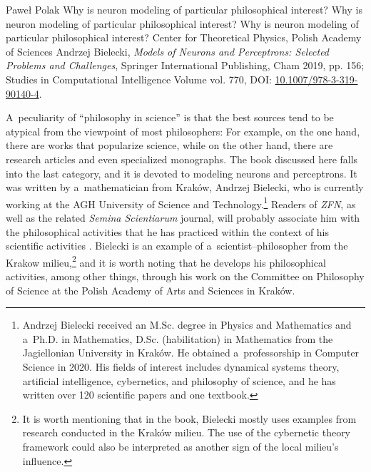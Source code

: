 \begin{newrevengenv}{Paweł Polak}
	{Why is neuron modeling of particular philosophical interest?}
	{Why is neuron modeling of particular philosophical interest?}
	{Why is neuron modeling of particular philosophical interest?}
	{Center for Theoretical Physics, Polish Academy of Sciences}
	{Andrzej Bielecki, \textit{Models of Neurons and Perceptrons: Selected Problems and Challenges}, Springer International Publishing, Cham 2019, pp. 156; Studies in Computational Intelligence Volume vol. 770, DOI: \href{https://doi.org/10.1007/978-3-319-90140-4}{10.1007/978-3-319-90140-4}.}
	
	
	
%



A~peculiarity of ``philosophy in science''
\parencites[see][]{heller_how_2019}[][]{polak_philosophy_2019} %
 is that the best sources tend to be atypical from the viewpoint of most philosophers: For example, on the one hand, there are works that popularize science, while on the other hand, there are research articles and even specialized monographs. The book discussed here falls into the last category, and it is devoted to modeling neurons and perceptrons. It was written by a~mathematician from Kraków, Andrzej Bielecki, who is currently working at the AGH University of Science and Technology.\footnote{Andrzej Bielecki received an M.Sc. degree in Physics and Mathematics and a~Ph.D. in Mathematics, D.Sc. (habilitation) in Mathematics from the Jagiellonian University in Kraków. He obtained a~professorship in Computer Science in 2020. His fields of interest includes dynamical systems theory, artificial intelligence, cybernetics, and philosophy of science, and he has written over 120 scientific papers and one textbook.} Readers of \textit{ZFN}, as well as the related \textit{Semina Scientiarum} journal, will probably associate him with the philosophical activities that he has practiced within the context of his scientific activities 
\parencites*[][]{bielecki_cybernetyczna_2016}[][]{bielecki_epistemologiczne_2018}. %
 Bielecki is an example of a~scientist–philosopher from the Krakow milieu,\footnote{It is worth mentioning that in the book, Bielecki mostly uses examples from research conducted in the Kraków milieu. The use of the cybernetic theory framework could also be interpreted as another sign of the local milieu's influence.} and it is worth noting that he develops his philosophical activities, among other things, through his work on the Committee on Philosophy of Science at the Polish Academy of Arts and Sciences in Kraków.


\end{newrevengenv}
